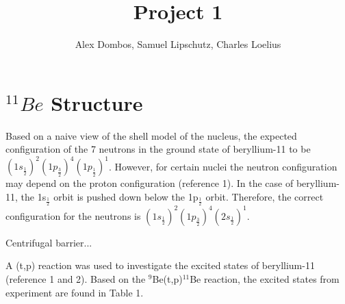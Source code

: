 \documentclass[11pt]{article} %
\title{Project 1}
\author{Alex Dombos, Samuel Lipschutz, Charles Loelius}
\begin{document}
\maketitle

\section{$^{11}Be$ Structure}


Based on a naive view of the shell model of the nucleus, the expected configuration of the 7 neutrons in the ground state of beryllium-11 to be $(1s_{\frac{1}{2}})^{2}(1p_{\frac{3}{2}})^{4}(1p_{\frac{1}{2}})^{1}$. However, for certain nuclei the neutron configuration may depend on the proton configuration (reference 1). In the case of beryllium-11, the 1s$_{\frac{1}{2}}$ orbit is pushed down below the 1p$_{\frac{1}{2}}$ orbit. Therefore, the correct configuration for the neutrons is $(1s_{\frac{1}{2}})^{2}(1p_{\frac{3}{2}})^{4}(2s_{\frac{1}{2}})^{1}$.

Centrifugal barrier...

A (t,p) reaction was used to investigate the excited states of beryllium-11 (reference 1 and 2). Based on the $^{9}$Be(t,p)$^{11}$Be reaction, the excited states from experiment are found in Table 1.
\end{document}
